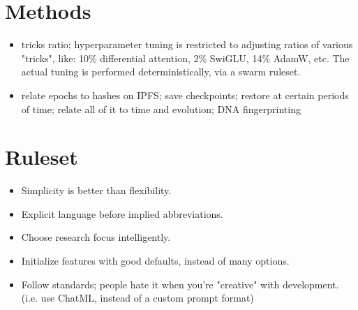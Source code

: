 \documentclass{article}
\begin{document}
\section{Methods}

\begin{itemize}
    \item tricks ratio; hyperparameter tuning is restricted to adjusting ratios of various "tricks", like: 10\% differential attention, 2\% SwiGLU, 14\% AdamW, etc. The actual tuning is performed deterministically, via a swarm ruleset.
    \item relate epochs to hashes on IPFS; save checkpoints; restore at certain periods of time; relate all of it to time and evolution; DNA fingerprinting
\end{itemize}

\section{Ruleset}

\begin{itemize}
    \item Simplicity is better than flexibility.
    \item Explicit language before implied abbreviations.
    \item Choose research focus intelligently.
    \item Initialize features with good defaults, instead of many options.
    \item Follow standards; people hate it when you're "creative" with development. (i.e. use ChatML, instead of a custom prompt format)
\end{itemize}



\end{document}
